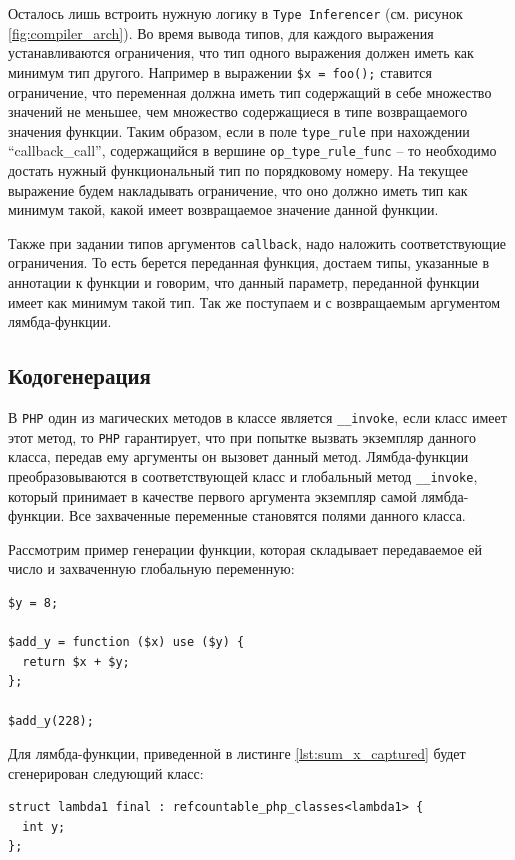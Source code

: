 Осталось лишь встроить нужную логику в \verb|Type Inferencer| (см. рисунок \ref{fig:compiler_arch}).
Во время вывода типов, для каждого выражения устанавливаются ограничения, что тип одного выражения должен иметь как минимум тип другого.
Например в выражении \verb|$x = foo();| ставится ограничение, что переменная должна иметь тип содержащий в себе множество значений не меньшее, чем множество содержащиеся в типе возвращаемого значения функции.
Таким образом, если в поле \verb|type_rule| при нахождении ``callback\_call'', содержащийся в вершине \verb|op_type_rule_func| -- то необходимо достать нужный функциональный тип по порядковому номеру.
На текущее выражение будем накладывать ограничение, что оно должно иметь тип как минимум такой, какой имеет возвращаемое значение данной функции.

Также при задании типов аргументов \verb|callback|, надо наложить соответствующие ограничения.
То есть берется переданная функция, достаем типы, указанные в аннотации к функции и говорим, что данный параметр, переданной функции имеет как минимум такой тип.
Так же поступаем и с возвращаемым аргументом лямбда-функции.

\subsection{Кодогенерация}
В \verb|PHP| один из магических методов в классе является \verb|__invoke|, если класс имеет этот метод, то \verb|PHP| гарантирует, что при попытке вызвать экземпляр данного класса, передав ему аргументы он вызовет данный метод.
Лямбда-функции преобразовываются в соответствующей класс и глобальный метод \verb|__invoke|, который принимает в качестве первого аргумента экземпляр самой лямбда-функции.
Все захваченные переменные становятся полями данного класса.

Рассмотрим пример генерации функции, которая складывает передаваемое ей число и захваченную глобальную переменную:
\begin{lstlisting}[label={lst:sum_x_captured},caption={Пример функции, добавляющей к аргументу захваченное значение}]
$y = 8;

$add_y = function ($x) use ($y) {
  return $x + $y;
};

$add_y(228);
\end{lstlisting}

Для лямбда-функции, приведенной в листинге \ref{lst:sum_x_captured} будет сгенерирован следующий класс:
\begin{lstlisting}
struct lambda1 final : refcountable_php_classes<lambda1> {
  int y;
};
\end{lstlisting}

